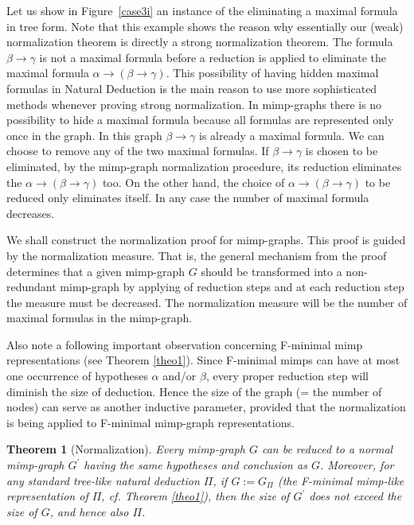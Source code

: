 \documentclass[submission,copyright,creativecommons]{eptcs}
\newtheorem{theorem}{Theorem}
\begin{document}
Let us show in Figure~\ref{case3i} an instance of the eliminating a maximal
formula in tree form. Note that this example shows the reason why
essentially our (weak) normalization theorem is directly a strong
normalization theorem. The formula $\beta\to\gamma$ is not a maximal formula
before a reduction is applied to eliminate the maximal formula $\alpha\to(\beta\to\gamma)$. This possibility of having hidden maximal
formulas in Natural Deduction is the main reason to use more sophisticated
methods whenever proving strong normalization. In mimp-graphs there is no
possibility to hide a maximal formula because all formulas are represented
only once in the graph. In this graph $\beta\to\gamma$ is already a maximal
formula. We can choose to remove any of the two maximal formulas. If $\beta\to\gamma$ is chosen to be eliminated, by the mimp-graph normalization
procedure, its reduction eliminates the $\alpha\to(\beta\to\gamma)$ too. On
the other hand, the choice of $\alpha\to(\beta\to\gamma)$ to be reduced only
eliminates itself. In any case the number of maximal formula decreases.

We shall construct the normalization proof for mimp-graphs. This proof is
guided by the normalization measure. That is, the general mechanism from the
proof determines that a given mimp-graph $G$ should be transformed into a
non-redundant mimp-graph by applying of reduction steps and at each
reduction step the measure must be decreased. The normalization measure will
be the number of maximal formulas in the mimp-graph.

Also note a following important observation concerning F-minimal mimp
representations (see Theorem \ref{theo1}). Since F-minimal mimps can have at most one
occurrence of hypotheses $\alpha$ and/or $\beta$, every proper reduction
step will diminish the size of deduction. Hence the size of the graph (= the
number of nodes) can serve as another inductive parameter, provided that the
normalization is being applied to F-minimal mimp-graph representations.


\begin{theorem}[Normalization]\label{theo2}
Every mimp-graph $G$ can be reduced to a normal mimp-graph $G^{\prime }$
having the same hypotheses and conclusion as $G$. Moreover, for any standard
tree-like natural deduction $\Pi$, if $G:=G_{\Pi}$ (the F-minimal
mimp-like representation of $\Pi$, cf. Theorem \ref{theo1}), then the size of $G^{\prime }$ does not exceed the size of $G$, and hence also $\Pi $.
\end{theorem}
\end{document}
